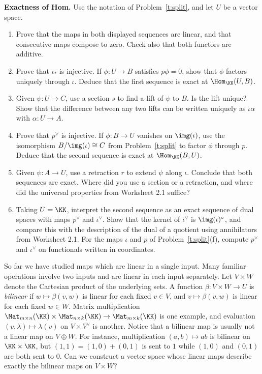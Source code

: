 \documentclass[12pt,reqno]{amsart}
\begin{document}
\begin{problems}
\item\label{t:homexact} \textbf{Exactness of Hom.} Use the notation of Problem~\ref{t:split}, and let $U$ be a vector space.
\begin{enumerate}
\item Prove that the maps in both displayed sequences are linear, and that consecutive maps compose to zero. Check also that both functors are additive.
\item Prove that $\iota_*$ is injective. If $\phi:U\to B$ satisfies $p\phi=0$, show that $\phi$ factors uniquely through $\iota$. Deduce that the first sequence is exact at $\Hom_{\KK}(U,B)$.
\item Given $\psi:U\to C$, use a section $s$ to find a lift of $\psi$ to $B$. Is the lift unique? Show that the difference between any two lifts can be written uniquely as $\iota\alpha$ with $\alpha:U\to A$.
\item Prove that $p^{\vee}$ is injective. If $\phi:B\to U$ vanishes on $\img(\iota)$, use the isomorphism $B/\img(\iota)\cong C$ from Problem~\ref{t:split} to factor $\phi$ through $p$. Deduce that the second sequence is exact at $\Hom_{\KK}(B,U)$.
\item Given $\psi:A\to U$, use a retraction $r$ to extend $\psi$ along $\iota$. Conclude that both sequences are exact. Where did you use a section or a retraction, and where did the universal properties from Worksheet 2.1 suffice?
\item Taking $U=\KK$, interpret the second sequence as an exact sequence of dual spaces with maps $p^{\vee}$ and $\iota^{\vee}$. Show that the kernel of $\iota^{\vee}$ is $\img(\iota)^\circ$, and compare this with the description of the dual of a quotient using annihilators from Worksheet 2.1. For the maps $\iota$ and $p$ of Problem~\ref{t:split}(f), compute $p^{\vee}$ and $\iota^{\vee}$ on functionals written in coordinates.
\end{enumerate}
\end{problems}

\hrulefill

So far we have studied maps which are linear in a single input. Many familiar operations involve two inputs and are linear in each input separately. Let $V\times W$ denote the Cartesian product of the underlying sets. A function $\beta:V\times W\to U$ is \emph{bilinear} if $w\mapsto\beta(v,w)$ is linear for each fixed $v\in V$, and $v\mapsto\beta(v,w)$ is linear for each fixed $w\in W$. Matrix multiplication $\Mat_{m\times n}(\KK)\times\Mat_{n\times k}(\KK)\to\Mat_{m\times k}(\KK)$ is one example, and evaluation $(v,\lambda)\mapsto\lambda(v)$ on $V\times V^{\vee}$ is another. Notice that a bilinear map is usually not a linear map on $V\oplus W$. For instance, multiplication $(a,b)\mapsto ab$ is bilinear on $\KK\times\KK$, but $(1,1)=(1,0)+(0,1)$ is sent to $1$ while $(1,0)$ and $(0,1)$ are both sent to $0$. Can we construct a vector space whose linear maps describe exactly the bilinear maps on $V\times W$?
\end{document}

